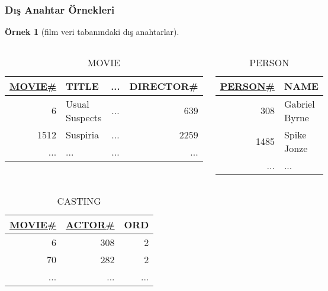 \documentclass[dvipsnames]{beamer}
\theoremstyle{definition}
\theoremstyle{example}
\newtheorem{ornek}[theorem]{Örnek}
\theoremstyle{plain}
\begin{document}
\begin{frame}
  \frametitle{Dış Anahtar Örnekleri}

  \begin{ornek}[film veri tabanındaki dış anahtarlar]
    \begin{columns}
      \begin{tiny}
      \begin{table}
        \caption{MOVIE}
        \begin{tabular}{|r|l|c|r|}\hline
\underline{MOVIE\#} & TITLE & ... & DIRECTOR\#\\[2pt]\hline\hline
         6 & Usual Suspects & ... &        639\\\hline
      1512 & Suspiria       & ... &       2259\\\hline
       ... & ...            & ... &        ...\\\hline
        \end{tabular}
      \end{table}
      \end{tiny}

      \begin{tiny}
      \begin{table}
        \caption{PERSON}
        \begin{tabular}{|r|l|}\hline
\underline{PERSON\#} & NAME\\[2pt]\hline\hline
        308 & Gabriel Byrne\\\hline
       1485 & Spike Jonze  \\\hline
        ... & ...          \\\hline
        \end{tabular}
      \end{table}
      \end{tiny}
    \end{columns}

    \begin{tiny}
    \begin{table}
      \caption{CASTING}
      \begin{tabular}{|r|r|r|}\hline
\underline{MOVIE\#} & \underline{ACTOR\#} & ORD\\[2pt]\hline\hline
                  6 &                 308 &   2\\\hline
                 70 &                 282 &   2\\\hline
                ... &                 ... & ...\\\hline
      \end{tabular}
    \end{table}
    \end{tiny}
  \end{ornek}


\end{frame}
\end{document}
